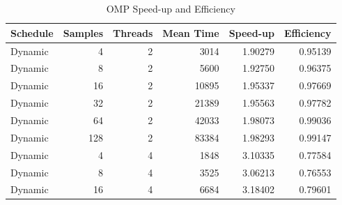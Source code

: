 \documentclass[journal,transmag]{IEEEtran}
\begin{document}
\section{}
	\begin{table}[h]		
	\centering
	\caption{OMP Speed-up and Efficiency}
	\label{table_omp_data}
	\begin{tabular}{|l|r|r|r|r|r|}
		\hline
		Schedule & \multicolumn{1}{l|}{Samples} & \multicolumn{1}{l|}{Threads} & \multicolumn{1}{l|}{Mean Time} & \multicolumn{1}{l|}{Speed-up} & \multicolumn{1}{l|}{Efficiency} \\ \hline
		Dynamic       & 4                            & 2                            & 3014                              & 1.90279                       & 0.95139                         \\ \hline
		Dynamic       & 8                            & 2                            & 5600                              & 1.92750                       & 0.96375                         \\ \hline
		Dynamic       & 16                           & 2                            & 10895                             & 1.95337                       & 0.97669                         \\ \hline
		Dynamic       & 32                           & 2                            & 21389                             & 1.95563                       & 0.97782                         \\ \hline
		Dynamic       & 64                           & 2                            & 42033                             & 1.98073                       & 0.99036                         \\ \hline
		Dynamic       & 128                          & 2                            & 83384                             & 1.98293                       & 0.99147                         \\ \hline
		Dynamic       & 4                            & 4                            & 1848                              & 3.10335                       & 0.77584                         \\ \hline
		Dynamic       & 8                            & 4                            & 3525                              & 3.06213                       & 0.76553                         \\ \hline
		Dynamic       & 16                           & 4                            & 6684                              & 3.18402                       & 0.79601                         \\ \hline

\end{tabular}
\end{table}
\end{document}
